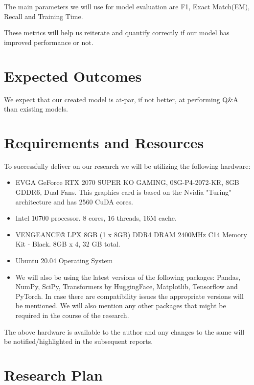 \documentclass[11pt]{article}
\begin{document}
    The main parameters we will use for model evaluation are F1, Exact Match(EM), Recall and Training Time.

    These metrics will help us reiterate and quantify correctly if our model has improved performance or not.

	\section{Expected Outcomes}\label{expectedoutcomes}

	We expect that our created model is at-par, if not better, at performing Q\&A than existing models.
	\section{Requirements and Resources}\label{resources}

	To successfully deliver on our research we will be utilizing the following hardware:
	\begin{itemize}
		\item EVGA GeForce RTX 2070 SUPER KO GAMING, 08G-P4-2072-KR, 8GB GDDR6, Dual Fans\citep{evga}. This graphics card is based on the Nvidia "Turing" architecture and has 2560 CuDA cores.
		\item Intel 10700 processor. 8 cores, 16 threads, 16M cache\citep{intel}.
		\item VENGEANCE® LPX 8GB (1 x 8GB) DDR4 DRAM 2400MHz C14 Memory Kit - Black\citep{Ram}. 8GB x 4, 32 GB total.
		\item Ubuntu 20.04 Operating System
		\item We will also be using the latest versions of the following packages: Pandas, NumPy, SciPy, Transformers by HuggingFace, Matplotlib, Tensorflow and PyTorch. In case there are compatibility issues the appropriate versions will be mentioned. We will also mention any other packages that might be required in the course of the research.
	\end{itemize}


	The above hardware is available to the author and any changes to the same will be notified/highlighted in the subsequent reports.
	\section{Research Plan}\label{plan}
\end{document}
